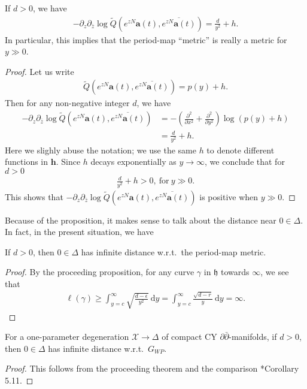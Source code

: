 \begin{proposition}
If \(d>0\), we have
\begin{eqnarray*}
-\partial_{z}\partial_{\bar{z}}\log
\tilde{Q}(e^{zN}\mathbf{a}(t),\overline{e^{zN}\mathbf{a}(t)}) = \frac{d}{y^{2}} +h.
\end{eqnarray*}
In particular, this implies that the 
period-map ``metric'' is really a metric for \(y\gg 0\).
\end{proposition}
\begin{proof}
Let us write 
\begin{eqnarray*}
\tilde{Q}(e^{zN}\mathbf{a}(t),\overline{e^{zN}\mathbf{a}(t)})=p(y)+h.
\end{eqnarray*}
Then for any non-negative integer \(d\), we have
\begin{align*}
-\partial_{z}\partial_{\bar{z}}\log
\tilde{Q}(e^{zN}\mathbf{a}(t),\overline{e^{zN}\mathbf{a}(t)})
&=-\left(\frac{\partial^{2}}{\partial x^{2}}+\frac{\partial^{2}}{\partial y^{2}}\right)
\log(p(y)+h)\\
&=\frac{d}{y^{2}}+h.
\end{align*}
Here we slighly abuse the notation; we use the same \(h\)
to denote different functions in \(\mathbf{h}\).
Since \(h\) decays exponentially as \(y\to\infty\), we conclude that for \(d>0\)
\begin{eqnarray*}
\frac{d}{y^{2}}+h > 0,~\mbox{for}~y\gg 0.
\end{eqnarray*}
This shows that \(-\partial_{z}\partial_{\bar{z}}\log
\tilde{Q}(e^{zN}\mathbf{a}(t),\overline{e^{zN}\mathbf{a}(t)})\)
is positive when \(y\gg 0\).
\end{proof}

Because of the proposition, it makes
sense to talk about the distance
near \(0\in\Delta\).
In fact, in the present situation, we
have
\begin{theorem}
\label{thm_infinite-distance}
If \(d>0\), then \(0\in\Delta\) has infinite distance w.r.t.~the period-map metric.
\end{theorem}
\begin{proof}
By the proceeding proposition, for any 
curve \(\gamma\) in \(\mathfrak{h}\) towards \(\infty\), we see that 
\begin{eqnarray*}
\ell(\gamma)\ge \int_{y=c}^{\infty} \sqrt{\frac{d-\epsilon}{y^{2}}}~\mathrm{d}y=
\int_{y=c}^{\infty} \frac{\sqrt{d-r}}{y}~\mathrm{d}y = \infty.
\end{eqnarray*}
\end{proof}

\begin{theorem}
\label{thm_infinite-distance-wp}
For a one-parameter degeneration \(\mathcal{X}\to\Delta\) of compact CY \(\partial\bar{\partial}\)-manifolds,
if \(d>0\), then \(0\in\Delta\) has infinite distance w.r.t.~\(G_{WP}\).
\end{theorem}
\begin{proof}
This follows from the proceeding theorem and the comparison 
\cite{2019-Popovici-holomorphic-deformations-of-balanced-calabi-yau-d-dbar-manifolds}*{Corollary 5.11}.
\end{proof}




